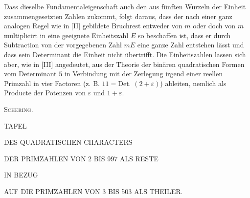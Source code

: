 Dass dieselbe Fundamentaleigenschaft auch den aus fünften Wurzeln der Einheit zusammengesetzten Zahlen zukommt, folgt daraus, dass der nach einer ganz analogen Regel wie in [II] gebildete Bruchrest entweder von $m$ oder doch von $m$ multiplicirt in eine geeignete Einheitszahl $E$ so beschaffen ist, dass er durch Subtraction von der vorgegebenen Zahl $mE$ eine ganze Zahl entstehen lässt und dass sein Determinant die Einheit nicht übertrifft. Die Einheitszahlen lassen sich aber, wie in [III] angedeutet, aus der Theorie der binären quadratischen Formen vom Determinant $5$ in Verbindung mit der Zerlegung irgend einer reellen Primzahl in vier Factoren (z. B. $11=\text{Det. }(2+\varepsilon)$) ableiten, nemlich als Producte der Potenzen von $\varepsilon$ und $1+\varepsilon$.
\begin{flushright}\textsc{Schering.}\end{flushright}

\clearpage
{}%
\renewcommand{\BookRunningTitle}{Tafel des quadratischen Characters}
\begin{center}
{\Large TAFEL}\par\bigskip
DES QUADRATISCHEN CHARACTERS\par\bigskip
DER PRIMZAHLEN VON 2 BIS 997 ALS RESTE\par\bigskip
IN BEZUG\par\bigskip
AUF DIE PRIMZAHLEN VON 3 BIS 503 ALS THEILER.
\end{center}
\clearpage

